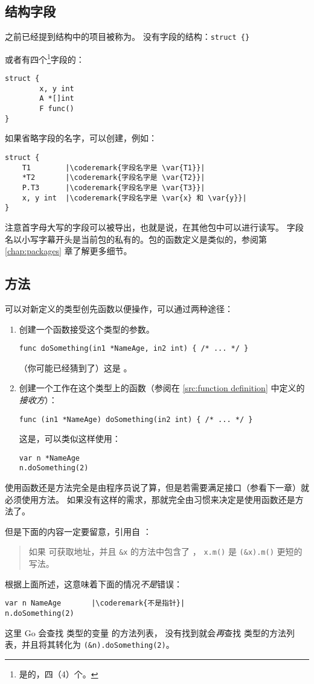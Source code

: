 \subsection{结构字段}
之前已经提到结构中的项目被称为。
没有字段的结构：\lstinline|struct {}|

或者有四个\footnote{是的，四（4）个。}字段的：
\begin{lstlisting}
struct {
        x, y int
        A *[]int
        F func()
}
\end{lstlisting}
如果省略字段的名字，可以创建，例如：
\begin{lstlisting}
struct {
    T1        |\coderemark{字段名字是 \var{T1}}|
    *T2       |\coderemark{字段名字是 \var{T2}}|
    P.T3      |\coderemark{字段名字是 \var{T3}}|
    x, y int  |\coderemark{字段名字是 \var{x} 和 \var{y}}|
}
\end{lstlisting}
注意首字母大写的字段可以被导出，也就是说，在其他包中可以进行读写。
字段名以小写字幕开头是当前包的私有的。包的函数定义是类似的，参阅第 \ref{chap:packages} 章了解更多细节。

\subsection{方法}
\label{sec:methods}
可以对新定义的类型创先函数以便操作，可以通过两种途径：
\begin{enumerate}
\item 创建一个函数接受这个类型的参数。
\begin{lstlisting}
func doSomething(in1 *NameAge, in2 int) { /* ... */ }
\end{lstlisting}
（你可能已经猜到了）这是 。
\item 创建一个工作在这个类型上的函数（参阅在 \ref{src:function definition}
中定义的\emph{接收方}）：
\begin{lstlisting}
func (in1 *NameAge) doSomething(in2 int) { /* ... */ }
\end{lstlisting}
这是，可以类似这样使用：
\begin{lstlisting}
var n *NameAge
n.doSomething(2)
\end{lstlisting}
\end{enumerate}

使用函数还是方法完全是由程序员说了算，但是若需要满足接口（参看下一章）就必须使用方法。
如果没有这样的需求，那就完全由习惯来决定是使用函数还是方法了。

但是下面的内容一定要留意，引用自 \cite{go_spec}：
\begin{quote}
如果  可获取地址，并且 \lstinline{&x} 的方法中包含了 ，
\lstinline{x.m()} 是 \lstinline{(&x).m()} 更短的写法。
\end{quote}
根据上面所述，这意味着下面的情况\emph{不是}错误：
\begin{lstlisting}
var n NameAge	    |\coderemark{不是指针}|
n.doSomething(2)    
\end{lstlisting}
这里 Go 会查找  类型的变量  的方法列表，
没有找到就会\emph{再}查找  类型的方法列表，并且将其转化为
\lstinline{(&n).doSomething(2)}。

